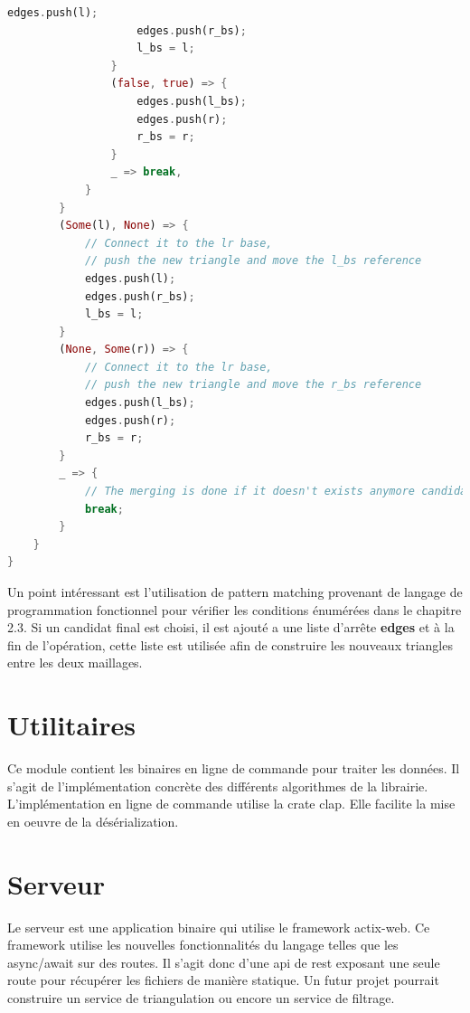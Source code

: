 \begin{lstlisting}[language=Rust, style=boxed]
                    edges.push(l);
                    edges.push(r_bs);
                    l_bs = l;
                }
                (false, true) => {
                    edges.push(l_bs);
                    edges.push(r);
                    r_bs = r;
                }
                _ => break,
            }
        }
        (Some(l), None) => {
            // Connect it to the lr base,
            // push the new triangle and move the l_bs reference
            edges.push(l);
            edges.push(r_bs);
            l_bs = l;
        }
        (None, Some(r)) => {
            // Connect it to the lr base, 
            // push the new triangle and move the r_bs reference
            edges.push(l_bs);
            edges.push(r);
            r_bs = r;
        }
        _ => {
            // The merging is done if it doesn't exists anymore candidates
            break;
        }
    }
}
\end{lstlisting}

Un point intéressant est l'utilisation de pattern matching provenant de langage de programmation fonctionnel pour vérifier les conditions énumérées dans le chapitre 2.3. Si un candidat final est choisi, il est ajouté a une liste d'arrête \textbf{edges} et à la fin de l'opération, cette liste est utilisée afin de construire les nouveaux triangles entre les deux maillages.

\section{Utilitaires}

Ce module contient les  binaires en ligne de commande pour traiter les données. Il s'agit de l'implémentation concrète des différents algorithmes de la librairie. L'implémentation en ligne de commande utilise la crate clap. Elle facilite la mise en oeuvre de la désérialization. 

\section{Serveur}

Le serveur est une application binaire qui utilise le framework actix-web. Ce framework utilise les nouvelles fonctionnalités du langage telles que les async/await sur des routes. Il s'agit donc d'une \gls{api} de \gls{rest} exposant une seule route pour récupérer les fichiers de manière statique. Un futur projet pourrait construire un service de triangulation ou encore un service de filtrage.

